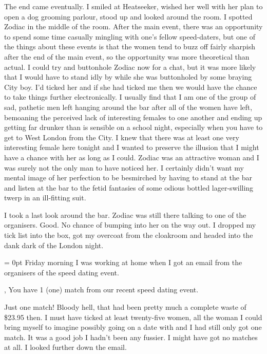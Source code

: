 The end came eventually. I smiled at Heatseeker, wished her well
with her plan to open a dog grooming parlour, stood up and looked
around the room. I spotted Zodiac in the middle of the room. After
the main event, there was an opportunity to spend some time casually
mingling with one's fellow speed-daters, but one of the things about
these events is that the women tend to buzz off fairly sharpish
after the end of the main event, so the opportunity was more
theoretical than actual. I could try and buttonhole Zodiac now for a
chat, but it was more likely that I would have to stand idly by
while she was buttonholed by some braying City boy. I'd ticked her
and if she had ticked me then we would have the chance to take
things further electronically. I usually find that I am one of the
group of sad, pathetic men left hanging around the bar after all of
the women have left, bemoaning the perceived lack of interesting
females to one another and ending up getting far drunker than is
sensible on a school night, especially when you have to get to West
London from the City. I knew that there was at least one {\twelveit
very\/} interesting female here tonight and I wanted to preserve the
illusion that I might have a chance with her as long as I could.
Zodiac was an attractive woman and I was surely not the only man to
have noticed her. I certainly didn't want my mental image of her
perfection to be besmirched by having to stand at the bar and listen at the bar to the
fetid fantasies of some odious bottled lager-swilling twerp in an
ill-fitting suit.

I took a last look around the bar. Zodiac was still there talking to
one of the organisers. Good. No chance of bumping into her on the
way out. I dropped my tick list into the box, got my overcoat from
the cloakroom and headed into the dank dark of the London night.

\vskip 1cm

{\parindent = 0pt Friday morning I was working at home when I got an email from
the organisers of the speed dating event.}

\vskip 12pt

{\twelvett{},
You have 1 (one) match from our recent speed dating event.}

\vskip 12pt

Just one match! Bloody hell, that had been pretty much a complete
waste of {\twelveit \$}23.95 then. I must have ticked at least
twenty-five women, all the woman I could bring myself to imagine
possibly going on a date with and I had still only got one match. It
was a good job I hadn't been any fussier. I might have got no
matches at all. I looked further down the email.

